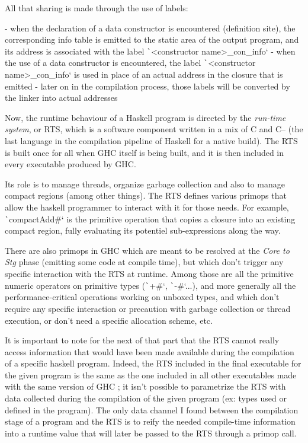 \documentclass[english]{jflart}
\begin{document}
All that sharing is made through the use of labels:

- when the declaration of a data constructor is encountered (definition site), the corresponding info table is emitted to the static area of the output program, and its address is associated with the label \texttt`<constructor name>_con_info`
- when the use of a data constructor is encountered, the label \texttt`<constructor name>_con_info` is used in place of an actual address in the closure that is emitted
- later on in the compilation process, those labels will be converted by the linker into actual addresses

Now, the runtime behaviour of a Haskell program is directed by the \emph{run-time system}, or RTS, which is a software component written in a mix of C and C-- (the last language in the compilation pipeline of Haskell for a native build). The RTS is built once for all when GHC itself is being built, and it is then included in every executable produced by GHC.

Its role is to manage threads, organize garbage collection and also to manage compact regions (among other things). The RTS defines various primops that allow the haskell programmer to interact with it for those needs. For example, \texttt`compactAdd#` is the primitive operation that copies a closure into an existing compact region, fully evaluating its potentiel sub-expressions along the way.

There are also primops in GHC which are meant to be resolved at the \emph{Core to Stg} phase (emitting some code at compile time), but which don't trigger any specific interaction with the RTS at runtime. Among those are all the primitive numeric operators on primitive types (\texttt`+#`, \texttt`-#`...), and more generally all the performance-critical operations working on unboxed types, and which don't require any specific interaction or precaution with garbage collection or thread execution, or don't need a specific allocation scheme, etc.

It is important to note for the next of that part that the RTS cannot really access information that would have been made available during the compilation of a specific haskell program. Indeed, the RTS included in the final executable for the given program is the same as the one included in all other executables made with the same version of GHC ; it isn't possible to parametrize the RTS with data collected during the compilation of the given program (ex: types used or defined in the program). The only data channel I found between the compilation stage of a program and the RTS is to reify the needed compile-time information into a runtime value that will later be passed to the RTS through a primop call.
\end{document}
